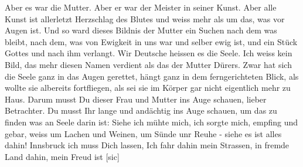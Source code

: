 \def\day{29.8.1942}
\mktitle

Aber es war die Mutter.
Aber er war der Meister in seiner Kunst.
Aber alle Kunst ist allerletzt Herzschlag des Blutes und weiss mehr als um das, was vor Augen ist.
Und so ward dieses Bildnis der Mutter ein Suchen nach dem was bleibt, nach dem, was von Ewigkeit in uns war und selber ewig ist, und ein St\"{u}ck Gottes und nach ihm verlangt.
Wir Deutsche heissen es die Seele.
Ich weiss kein Bild, das mehr diesen Namen verdient als das der Mutter D\"{u}rers.
Zwar hat sich die Seele ganz in das Augen gerettet, h\"{a}ngt ganz in dem ferngerichteten Blick, als wollte sie albereits fortfliegen, als sei sie im K\"{o}rper gar nicht eigentlich mehr zu Haus.
Darum musst Du dieser Frau und Mutter ins Auge schauen, lieber Betrachter.
Du musst Ihr lange und and\"{a}chtig ins Auge schauen, um das zu finden was an Seele darin ist: Siehe ich m\"{u}hte mich, ich sorgte mich, empfing und gebar, weiss um Lachen und Weinen, um S\"{u}nde unr Reuhe - siehe es ist alles dahin!
Innsbruck ich muss Dich lassen, Ich fahr dahin mein Strassen, in fremde Land dahin, mein Freud ist{\color{red} [sic] }


\clearpage
